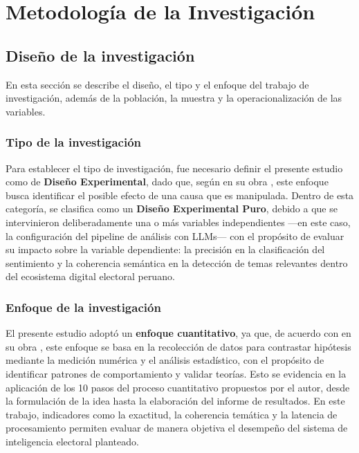 \documentclass[listof=nochaptergap,12pt,times,authoryear]{report}
\let\cite\textcite
\begin{document}
\chapter{Metodología de la Investigación}
 
\section{Diseño de la investigación}
 
En esta sección se describe el diseño, el tipo y el enfoque del trabajo de investigación, además de la población, la muestra y la operacionalización de las variables.
 
\subsection{Tipo de la investigación}
 
Para establecer el tipo de investigación, fue necesario definir el presente estudio como de \textbf{Diseño Experimental}, dado que, según \cite{bk_hernandez2014metodologia} en su obra , este enfoque busca identificar el posible efecto de una causa que es manipulada. Dentro de esta categoría, se clasifica como un \textbf{Diseño Experimental Puro}, debido a que se intervinieron deliberadamente una o más variables independientes —en este caso, la configuración del pipeline de análisis con LLMs— con el propósito de evaluar su impacto sobre la variable dependiente: la precisión en la clasificación del sentimiento y la coherencia semántica en la detección de temas relevantes dentro del ecosistema digital electoral peruano.

\subsection{Enfoque de la investigación}
 
El presente estudio adoptó un \textbf{enfoque cuantitativo}, ya que, de acuerdo con \cite{bk_hernandez2014metodologia} en su obra , este enfoque se basa en la recolección de datos para contrastar hipótesis mediante la medición numérica y el análisis estadístico, con el propósito de identificar patrones de comportamiento y validar teorías. Esto se evidencia en la aplicación de los 10 pasos del proceso cuantitativo propuestos por el autor, desde la formulación de la idea hasta la elaboración del informe de resultados. En este trabajo, indicadores como la exactitud, la coherencia temática y la latencia de procesamiento permiten evaluar de manera objetiva el desempeño del sistema de inteligencia electoral planteado.
 
\end{document}
